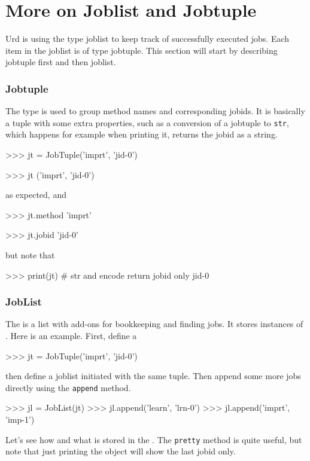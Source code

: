 \section{More on Joblist and Jobtuple}

Urd is using the type joblist to keep track of successfully executed
jobs.  Each item in the joblist is of type jobtuple.  This section
will start by describing jobtuple first and then joblist.

\subsubsection{Jobtuple}

The \jobtuple type is used to group method names and corresponding
jobids.  It is basically a tuple with some extra properties, such as a
conversion of a jobtuple to \texttt{str}, which happens for example
when printing it, returns the jobid as a string.

\begin{python}
>>> jt = JobTuple('imprt', 'jid-0')

>>> jt
('imprt', 'jid-0')
\end{python}
as expected, and

\begin{python}
>>> jt.method
'imprt'

>>> jt.jobid
'jid-0'
\end{python}
but note that

\begin{python}
>>> print(jt)  # str and encode return jobid only
jid-0
\end{python}



\subsubsection{JobList}

\label{sec:joblist}
The \joblist is a list with add-ons for bookkeeping and finding jobs.
It stores instances of \jobtuple.  Here is an example.  First, define
a \jobtuple

\begin{python}
>>> jt = JobTuple('imprt', 'jid-0')
\end{python}
then define a joblist initiated with the same tuple.  Then append some
more jobs directly using the \texttt{append} method.

\begin{python}
>>> jl = JobList(jt)
>>> jl.append('learn', 'lrn-0')
>>> jl.append('imprt', 'imp-1')
\end{python}
Let's see how and what is stored in the \joblist.  The \texttt{pretty}
method is quite useful, but note that just printing the object will
show the last jobid only.


